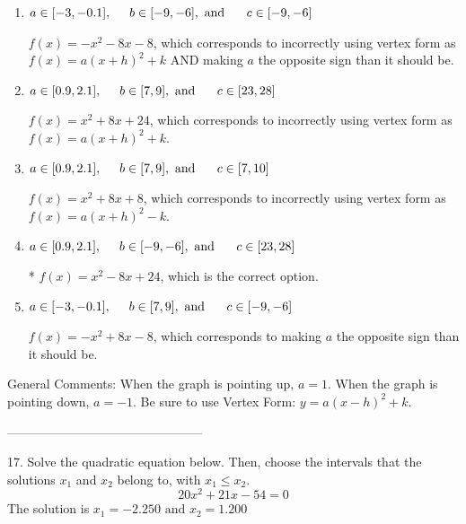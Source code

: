 \documentclass{extbook}[14pt]
\begin{document}
\begin{enumerate}[label=\Alph*.] 
\item $ a \in [-3, -0.1], \hspace*{5mm} b \in [-9, -6], \text{ and } \hspace*{5mm} c \in [-9, -6] $ 

 $f(x)=-x^{2} -8 x -8$, which corresponds to incorrectly using vertex form as $f(x) = a(x+h)^2+k$ AND making $a$ the opposite sign than it should be. 
\item $ a \in [0.9, 2.1], \hspace*{5mm} b \in [7, 9], \text{ and } \hspace*{5mm} c \in [23, 28] $ 

 $f(x)=x^{2} +8 x + 24$, which corresponds to incorrectly using vertex form as $f(x) = a(x+h)^2+k$. 
\item $ a \in [0.9, 2.1], \hspace*{5mm} b \in [7, 9], \text{ and } \hspace*{5mm} c \in [7, 10] $ 

 $f(x)=x^{2} +8 x + 8$, which corresponds to incorrectly using vertex form as $f(x) = a(x+h)^2 - k$. 
\item $ a \in [0.9, 2.1], \hspace*{5mm} b \in [-9, -6], \text{ and } \hspace*{5mm} c \in [23, 28] $ 

 * $f(x)=x^{2} -8 x + 24$, which is the correct option. 
\item $ a \in [-3, -0.1], \hspace*{5mm} b \in [7, 9], \text{ and } \hspace*{5mm} c \in [-9, -6] $ 

 $f(x)=-x^{2} +8 x -8$, which corresponds to making $a$ the opposite sign than it should be. 
\end{enumerate} 
 
General Comments: When the graph is pointing up, $a=1$. When the graph is pointing down, $a=-1$. Be sure to use Vertex Form: $y = a(x-h)^2+k$.

-----------------------------------------------

17. Solve the quadratic equation below. Then, choose the intervals that the solutions $x_1$ and $x_2$ belong to, with $x_1 \leq x_2$.
\[ 20x^{2} +21 x -54 = 0 \] 
The solution is $ x_1 = -2.250 \text{ and } x_2 = 1.200 $ 
\end{document}
